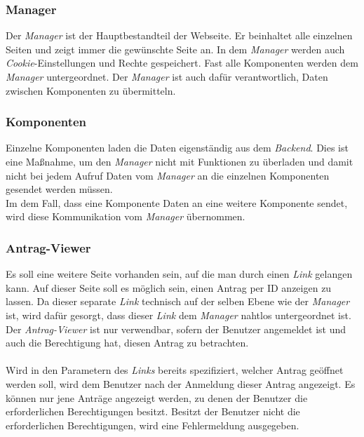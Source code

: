 \subsubsection{Manager}
Der \textit{Manager} ist der Hauptbestandteil der Webseite. Er beinhaltet alle einzelnen Seiten und zeigt immer die gewünschte Seite an. In dem \textit{Manager} werden auch \textit{Cookie}-Einstellungen und Rechte gespeichert. Fast alle Komponenten werden dem \textit{Manager} untergeordnet. Der \textit{Manager} ist auch dafür verantwortlich, Daten zwischen Komponenten zu übermitteln.

\subsubsection{Komponenten}
Einzelne Komponenten laden die Daten eigenständig aus dem \textit{Backend}. Dies ist eine Maßnahme, um den \textit{Manager} nicht mit Funktionen zu überladen und damit nicht bei jedem Aufruf Daten vom \textit{Manager} an die einzelnen Komponenten gesendet werden müssen.\\
Im dem Fall, dass eine Komponente Daten an eine weitere Komponente sendet, wird diese Kommunikation vom \textit{Manager} übernommen.

\subsubsection{Antrag-Viewer}
Es soll eine weitere Seite vorhanden sein, auf die man durch einen \textit{Link} gelangen kann. Auf dieser Seite soll es möglich sein, einen Antrag per ID anzeigen zu lassen. Da dieser separate \textit{Link} technisch auf der selben Ebene wie der \textit{Manager} ist, wird dafür gesorgt, dass dieser \textit{Link} dem \textit{Manager} nahtlos untergeordnet ist. Der \textit{Antrag-Viewer} ist nur verwendbar, sofern der Benutzer angemeldet ist und auch die Berechtigung hat, diesen Antrag zu betrachten.
\\\\
Wird in den Parametern des \textit{Links} bereits spezifiziert, welcher Antrag geöffnet werden soll, wird dem Benutzer nach der Anmeldung dieser Antrag angezeigt. Es können nur jene Anträge angezeigt werden, zu denen der Benutzer die erforderlichen Berechtigungen besitzt. Besitzt der Benutzer nicht die erforderlichen Berechtigungen, wird eine Fehlermeldung ausgegeben.

